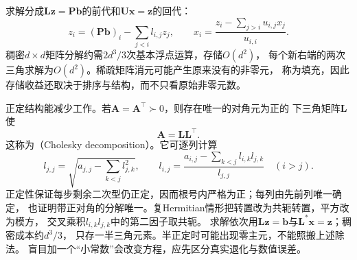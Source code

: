 求解分成$\bm L\bm z=\bm P\bm b$的前代和$\bm U\bm x=\bm z$的回代：
\[
 z_i=(\bm P\bm b)_i-\sum_{j<i}l_{i,j}z_j,\qquad
 x_i=\frac{z_i-\sum_{j>i}u_{i,j}x_j}{u_{i,i}}.
\]
稠密$d\times d$矩阵分解约需$2d^3/3$次基本浮点运算，存储$O(d^2)$，
每个新右端的两次三角求解为$O(d^2)$。稀疏矩阵消元可能产生原来没有的非零元，
称为填充，因此存储收益还取决于排序与结构，而不只看原始非零元数。

正定结构能减少工作。若$\bm A=\bm A^\top\succ0$，则存在唯一的对角元为正的
下三角矩阵$\bm L$使
\begin{equation}
 \bm A=\bm L\bm L^\top.
 \label{eq:matrix-analysis-cholesky}
\end{equation}
这称为（Cholesky decomposition）。它可逐列计算
\[
 l_{j,j}=\sqrt{a_{j,j}-\sum_{k<j}l_{j,k}^2},\qquad
 l_{i,j}=\frac{a_{i,j}-\sum_{k<j}l_{i,k}l_{j,k}}{l_{j,j}}\quad(i>j).
\]
正定性保证每步剩余二次型仍正定，因而根号内严格为正；每列由先前列唯一确定，
也证明带正对角的分解唯一。复Hermitian情形把转置改为共轭转置，平方改为模方，
交叉乘积$l_{i,k}l_{j,k}$中的第二因子取共轭。
求解依次用$\bm L\bm z=\bm b$与$\bm L^*\bm x=\bm z$；稠密成本约$d^3/3$，
只存一半三角元素。半正定时可能出现零主元，不能照搬上述除法。
盲目加一个“小常数”会改变方程，应先区分真实退化与数值误差。

